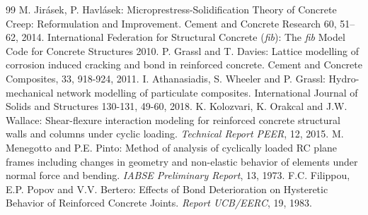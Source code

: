 \documentclass[a4paper]{article}
\begin{document}
\begin{thebibliography}{99}
 M. Jir\'{a}sek, P. Havl\'{a}sek: Microprestress-Solidification Theory of Concrete Creep: Reformulation and Improvement. Cement and Concrete Research 60, 51–62, 2014.
 International Federation for Structural Concrete (\textit{fib}): The \textit{fib} Model Code for Concrete Structures 2010.
 P. Grassl and T. Davies: Lattice modelling of corrosion induced cracking and bond in reinforced concrete. Cement and Concrete Composites, 33, 918-924, 2011.
 I. Athanasiadis, S. Wheeler and P. Grassl: Hydro-mechanical network modelling of particulate composites. International Journal of Solids and Structures 130-131, 49-60, 2018.
 K. Kolozvari, K. Orakcal and J.W. Wallace:  Shear-flexure  interaction  modeling  for  reinforced  concrete  structural  
walls  and  columns  under  cyclic  loading. {\em Technical  Report  PEER}, 12, 2015.
 M. Menegotto and P.E. Pinto: Method of analysis of cyclically loaded RC plane frames including changes in geometry and non-elastic behavior of elements under normal force and bending. {\em IABSE Preliminary Report}, 13, 1973.
 F.C. Filippou, E.P. Popov and V.V. Bertero: Effects of Bond Deterioration on Hysteretic Behavior of Reinforced Concrete Joints. {\em Report UCB/EERC}, 19, 1983.
\end{thebibliography}
\end{document}
